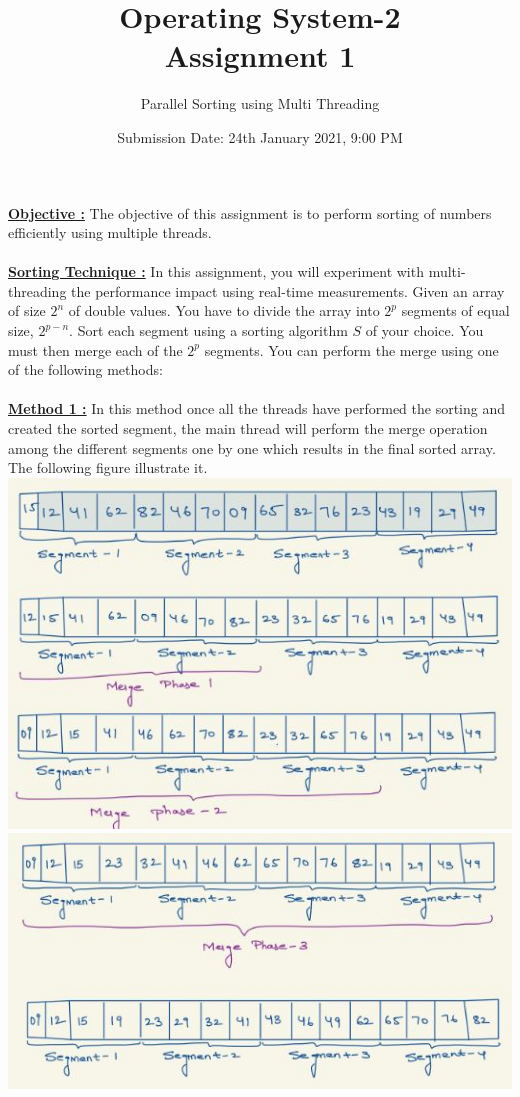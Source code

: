 \documentclass{article}
\title{Operating System-2 \\  Assignment 1}
\author{Parallel Sorting using Multi Threading }
\date{Submission Date: 24th January 2021, 9:00 PM }
\begin{document}
\maketitle
\noindent\textbf{\underline {Objective :}} The objective of this assignment is to perform sorting of numbers efficiently using multiple threads. 
\\\\ 

\noindent\textbf{\underline {Sorting Technique :}} In this assignment, you will experiment with multi-threading the performance impact using real-time measurements. Given an array of size $2^n$ of double values. You have to divide the array into $2^p$ segments of equal size, $2^{p-n}$. Sort each segment using a sorting algorithm $S$ of your choice. You must then merge each of the $2^p$ segments. You can perform the merge using one of the following methods: \\\\

\noindent\textbf{\underline {Method 1 :}} In this method once all the threads have performed the sorting and created the sorted segment, the main thread will perform the merge operation among the different segments one by one which results in the final sorted array. The following figure illustrate it. \\
\includegraphics[width=\textwidth]{IMG1.JPG}
\includegraphics[width=\textwidth]{img2.JPG}
\\\\ 
\end{document}
